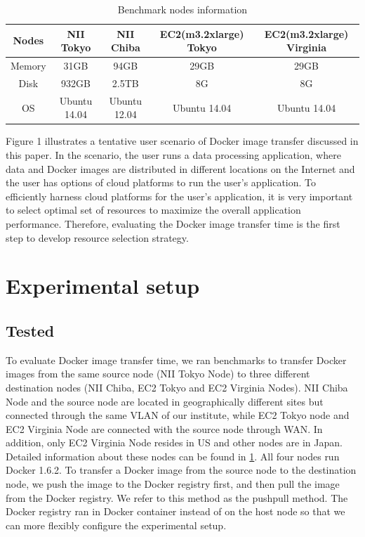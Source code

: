 \documentclass{ieicej}
\begin{document}
\begin{table}[t]
  \begin{center}
  \begin{tabular}{| c | c | c | c | c |}
  \hline
    Nodes   & NII Tokyo    & NII Chiba        & EC2(m3.2xlarge) Tokyo    & EC2(m3.2xlarge) Virginia \\
  \hline
    Memory  & 31GB         &  94GB            & 29GB                     &  29GB \\
  \hline
    Disk    & 932GB        &  2.5TB           & 8G                       &  8G \\
  \hline
    OS      & Ubuntu 14.04 &  Ubuntu 12.04    & Ubuntu 14.04             & Ubuntu 14.04 \\
  \hline
  \end{tabular}
  \caption{Benchmark nodes information}
  \label{bench_nodes_info}
  \end{center}
\end{table}

Figure 1 illustrates a tentative user scenario of Docker image transfer discussed in this paper. In the scenario, the user runs a data processing application, where data and Docker images are distributed in different locations on the Internet and the user has options of cloud platforms to run the user's application. To efficiently harness cloud platforms for the user's application, it is very important to select optimal set of resources to maximize the overall application performance. Therefore, evaluating the Docker image transfer time is the first step to develop resource selection strategy.


\section{Experimental setup}
\subsection{Tested}
To evaluate Docker image transfer time, we ran benchmarks to transfer Docker images from the same source node (NII Tokyo Node) to three different destination nodes (NII Chiba, EC2 Tokyo and EC2 Virginia Nodes).
NII Chiba Node and the source node are located in geographically different sites but connected through the same VLAN of our institute, while EC2 Tokyo node and EC2 Virginia Node are connected with the source node through WAN.
In addition, only EC2 Virginia Node resides in US and other nodes are in Japan.
Detailed information about these nodes can be found in \cref{bench_nodes_info}.
All four nodes run Docker 1.6.2. To transfer a Docker image from the source node to the destination node, we push the image to the Docker registry first, and then pull the image from the Docker registry.
We refer to this method as the pushpull method.
The Docker registry ran in Docker container instead of on the host node so that we can more flexibly configure the experimental setup.
\end{document}

